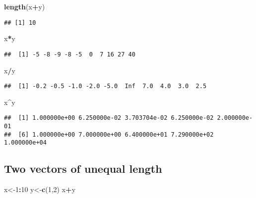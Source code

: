 \documentclass[
]{article}
\newenvironment{Shaded}{\begin{snugshade}}{\end{snugshade}}
\newcommand{\DecValTok}[1]{\textcolor[rgb]{0.00,0.00,0.81}{#1}}
\newcommand{\FunctionTok}[1]{\textcolor[rgb]{0.13,0.29,0.53}{\textbf{#1}}}
\newcommand{\NormalTok}[1]{#1}
\newcommand{\OtherTok}[1]{\textcolor[rgb]{0.56,0.35,0.01}{#1}}
\newcommand{\SpecialCharTok}[1]{\textcolor[rgb]{0.81,0.36,0.00}{\textbf{#1}}}
\begin{document}
\begin{Shaded}
\begin{Highlighting}[]
\FunctionTok{length}\NormalTok{(x}\SpecialCharTok{+}\NormalTok{y)}
\end{Highlighting}
\end{Shaded}

\begin{verbatim}
## [1] 10
\end{verbatim}

\begin{Shaded}
\begin{Highlighting}[]
\NormalTok{x}\SpecialCharTok{*}\NormalTok{y}
\end{Highlighting}
\end{Shaded}

\begin{verbatim}
##  [1] -5 -8 -9 -8 -5  0  7 16 27 40
\end{verbatim}

\begin{Shaded}
\begin{Highlighting}[]
\NormalTok{x}\SpecialCharTok{/}\NormalTok{y}
\end{Highlighting}
\end{Shaded}

\begin{verbatim}
##  [1] -0.2 -0.5 -1.0 -2.0 -5.0  Inf  7.0  4.0  3.0  2.5
\end{verbatim}

\begin{Shaded}
\begin{Highlighting}[]
\NormalTok{x}\SpecialCharTok{\^{}}\NormalTok{y}
\end{Highlighting}
\end{Shaded}

\begin{verbatim}
##  [1] 1.000000e+00 6.250000e-02 3.703704e-02 6.250000e-02 2.000000e-01
##  [6] 1.000000e+00 7.000000e+00 6.400000e+01 7.290000e+02 1.000000e+04
\end{verbatim}

\subsection{Two vectors of unequal
length}\label{two-vectors-of-unequal-length}

\begin{Shaded}
\begin{Highlighting}[]
\NormalTok{x}\OtherTok{\textless{}{-}}\DecValTok{1}\SpecialCharTok{:}\DecValTok{10}
\NormalTok{y}\OtherTok{\textless{}{-}}\FunctionTok{c}\NormalTok{(}\DecValTok{1}\NormalTok{,}\DecValTok{2}\NormalTok{)}
\NormalTok{x}\SpecialCharTok{+}\NormalTok{y}
\end{Highlighting}
\end{Shaded}
\end{document}
